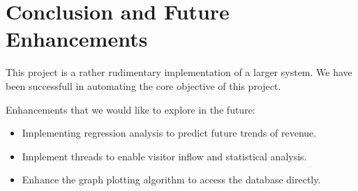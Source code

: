 \chapter{Conclusion and Future Enhancements}
This project is a rather rudimentary implementation of a larger system.
We have been successfull in automating the core objective of this project.

Enhancements that we would like to explore in the future:
\begin{itemize}
\item Implementing regression analysis to predict future trends of revenue.
\item Implement threads to enable visitor inflow and statistical analysis.
\item Enhance the graph plotting algorithm to access the database directly.
\end{itemize}
